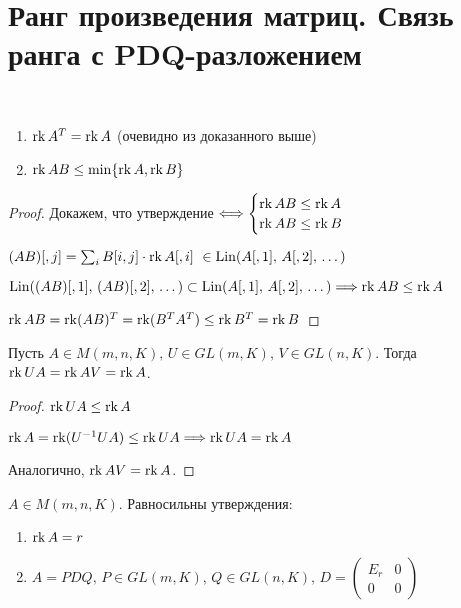 
\section{Ранг произведения матриц. Связь ранга с PDQ-разложением}

\begin{theorem-non} 
    \
    \begin{enumerate}
        \item $\operatorname{rk} A^T = \operatorname{rk} A$ (очевидно из доказанного выше)
        \item $\operatorname{rk} AB \leq \min \{\operatorname{rk} A, \operatorname{rk} B\}$
    \end{enumerate}

    \begin{proof}
        
        Докажем, что утверждение $\Longleftrightarrow
        \begin{cases}
            \operatorname{rk} AB \leq \operatorname{rk} A\\
            \operatorname{rk} AB \leq \operatorname{rk} B
        \end{cases}$

        $(AB)[, j] = \sum_i B[i,j] \cdot \operatorname{rk} A[, i] \ \in \operatorname{Lin}(A[, 1],\, A[, 2],\, \dots)$

        $\operatorname{Lin}((AB)[, 1],\, (AB)[, 2],\, \dots) \subset \operatorname{Lin}(A[, 1],\, A[, 2],\, \dots) \Longrightarrow \operatorname{rk} AB \leq \operatorname{rk} A$

        $\operatorname{rk} AB = \operatorname{rk} (AB)^T = \operatorname{rk} (B^T A^T) \leq \operatorname{rk} B^T = \operatorname{rk} B$

    \end{proof}

\end{theorem-non}

\follow Пусть $A \in M(m, n, K),\, U \in GL(m, K),\, V \in GL(n, K)$. Тогда $\operatorname{rk} UA = \operatorname{rk} AV = \operatorname{rk} A$.
\begin{proof}
    
    $\operatorname{rk} UA \leq \operatorname{rk} A$

    $\operatorname{rk} A = \operatorname{rk}(U^{-1}UA) \leq \operatorname{rk} UA \Longrightarrow \operatorname{rk} UA = \operatorname{rk} A$

    Аналогично, $\operatorname{rk} AV = \operatorname{rk} A$.

\end{proof}

\follow $A \in M(m, n, K)$. Равносильны утверждения:
\begin{enumerate}
    \item $\operatorname{rk} A = r$
    \item $A = PDQ,\, P \in GL(m, K),\, Q \in GL(n, K),\, D =
    \begin{pmatrix}
        E_r & 0\\
        0 & 0
    \end{pmatrix}$
\end{enumerate}

